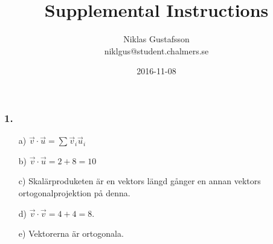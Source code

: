\documentclass{article}
\title{Supplemental Instructions}
\author{Niklas Gustafsson \\ 
		\small{niklgus@student.chalmers.se}
}
\date{
      2016-11-08
     }
\begin{document}
\maketitle
\subsubsection*{1.}
\begin{itemize}
\item[a) ] $\vec{v} \cdot \vec{u} = \sum \vec{v}_{i}\vec{u}_{i}$
\item[b) ] $\vec{v} \cdot \vec{u} = 2+8 = 10$
\item[c) ] Skalärproduketen är en vektors längd gånger en annan vektors ortogonalprojektion på denna.
\item[d) ] $\vec{v} \cdot \vec{v} = 4+4 = 8$.
\item[e) ] Vektorerna är ortogonala.
\end{itemize}

\end{document}
